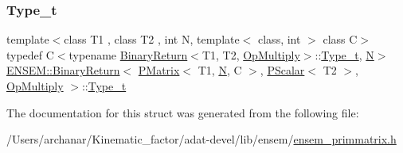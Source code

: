 \subsubsection{\texorpdfstring{Type\_t}{Type\_t}\hspace{0.1cm}{\footnotesize\ttfamily [3/3]}}
{\footnotesize\ttfamily template$<$class T1 , class T2 , int N, template$<$ class, int $>$ class C$>$ \\
typedef C$<$typename \mbox{\hyperlink{structENSEM_1_1BinaryReturn}{Binary\+Return}}$<$T1, T2, \mbox{\hyperlink{structENSEM_1_1OpMultiply}{Op\+Multiply}}$>$\+::\mbox{\hyperlink{structENSEM_1_1BinaryReturn_3_01PMatrix_3_01T1_00_01N_00_01C_01_4_00_01PScalar_3_01T2_01_4_00_01OpMultiply_01_4_a76b005be131c57afb03cbe700dbc4672}{Type\+\_\+t}}, \mbox{\hyperlink{adat__devel_2lib_2hadron_2operator__name__util_8cc_a7722c8ecbb62d99aee7ce68b1752f337}{N}}$>$ \mbox{\hyperlink{structENSEM_1_1BinaryReturn}{E\+N\+S\+E\+M\+::\+Binary\+Return}}$<$ \mbox{\hyperlink{classENSEM_1_1PMatrix}{P\+Matrix}}$<$ T1, \mbox{\hyperlink{adat__devel_2lib_2hadron_2operator__name__util_8cc_a7722c8ecbb62d99aee7ce68b1752f337}{N}}, C $>$, \mbox{\hyperlink{classENSEM_1_1PScalar}{P\+Scalar}}$<$ T2 $>$, \mbox{\hyperlink{structENSEM_1_1OpMultiply}{Op\+Multiply}} $>$\+::\mbox{\hyperlink{structENSEM_1_1BinaryReturn_3_01PMatrix_3_01T1_00_01N_00_01C_01_4_00_01PScalar_3_01T2_01_4_00_01OpMultiply_01_4_a76b005be131c57afb03cbe700dbc4672}{Type\+\_\+t}}}



The documentation for this struct was generated from the following file\+:\begin{DoxyCompactItemize}
\item 
/\+Users/archanar/\+Kinematic\+\_\+factor/adat-\/devel/lib/ensem/\mbox{\hyperlink{adat-devel_2lib_2ensem_2ensem__primmatrix_8h}{ensem\+\_\+primmatrix.\+h}}\end{DoxyCompactItemize}
